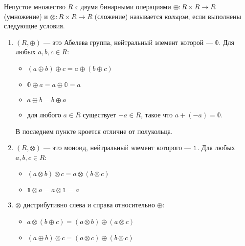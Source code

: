 \begin{definition}

	Непустое множество $R$ с двумя бинарными операциями $\oplus\colon R \times R \to R$ (умножение) и $\otimes \colon R \times R \to R$ (сложение) называется \emph{кольцом}, если выполнены следующие условия.
	\begin{enumerate}

		\item $(R, \oplus)$ --- это Абелева группа, нейтральный элемент которой --- $\mathbb{0}$. Для любых $a,b,c \in R$:
		      \begin{itemize}
			      \item $(a \oplus b) \oplus c = a \oplus (b \oplus c)$
			      \item $\mathbb{0} \oplus a = a \oplus \mathbb{0} = a$
			      \item $a \oplus b = b \oplus a$
			      \item для любого $a \in R$ существует $-a \in  R$, такое что $a + (-a) = \mathbb{0}$.
		      \end{itemize}
		      В последнем пункте кроется отличие от полукольца.

		\item $(R, \otimes)$ --- это моноид, нейтральный элемент которого --- $\mathbb{1}$. Для любых $a,b,c \in R$:
		      \begin{itemize}
			      \item $(a \otimes b) \otimes c = a \otimes (b \otimes c)$
			      \item $\mathbb{1} \otimes a = a \otimes \mathbb{1} = a$
		      \end{itemize}

		\item $\otimes$ дистрибутивно слева и справа относительно $\oplus$:
		      \begin{itemize}
			      \item $a \otimes (b \oplus c) = (a \otimes b) \oplus (a \otimes c)$
			      \item $(a \oplus b) \otimes c = (a \otimes c) \oplus (b \otimes c)$
		      \end{itemize}

	\end{enumerate}


\end{definition}
